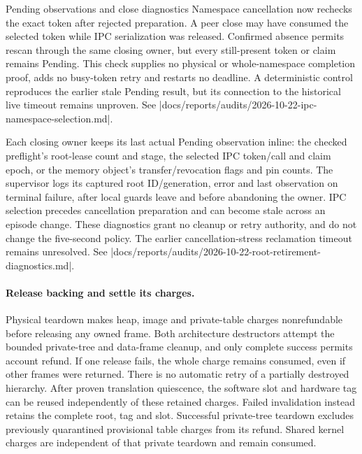\begin{implementationdetail}{Pending observations and close diagnostics}
Namespace cancellation now rechecks the exact token after rejected preparation.
A peer close may have consumed the selected token while IPC serialization was
released. Confirmed absence permits rescan through the same closing owner, but
every still-present token or claim remains Pending. This check supplies no
physical or whole-namespace completion proof, adds no busy-token retry and
restarts no deadline. A deterministic control reproduces the earlier stale
Pending result, but its connection to the historical live timeout remains unproven.
See \repofile|docs/reports/audits/2026-10-22-ipc-namespace-selection.md|.

Each closing owner keeps its last actual Pending observation inline: the
checked preflight's root-lease count and stage, the selected IPC token/call and
claim epoch, or the memory object's transfer/revocation flags and pin counts.
The supervisor logs its captured root ID/generation, error and last observation
on terminal failure, after local guards leave and before abandoning the owner.
IPC selection precedes cancellation preparation and can become stale across an
episode change. These diagnostics grant no cleanup or retry authority, and do
not change the five-second policy. The earlier cancellation-stress reclamation
timeout remains unresolved. See
\repofile|docs/reports/audits/2026-10-22-root-retirement-diagnostics.md|.
\end{implementationdetail}

\paragraph*{Release backing and settle its charges.}

Physical teardown makes heap, image and private-table charges nonrefundable before releasing
any owned frame. Both architecture destructors attempt the bounded private-tree
and data-frame cleanup, and only complete success permits account refund. If one
release fails, the whole charge remains consumed, even if other frames were
returned. There is no automatic retry of a partially destroyed hierarchy.
After proven translation quiescence, the software slot and hardware tag can be
reused independently of these retained charges. Failed invalidation instead
retains the complete root, tag and slot. Successful private-tree teardown excludes
previously quarantined provisional table charges from its refund. Shared kernel
charges are independent of that private teardown and remain consumed.

